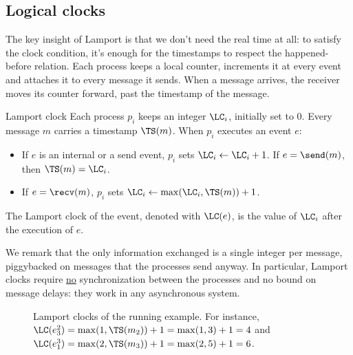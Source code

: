\subsection{Logical clocks}

The key insight of Lamport is that we don't need the real time at all: to satisfy the clock condition, it's enough for the timestamps to respect the happened-before relation. Each process keeps a local counter, increments it at every event and attaches it to every message it sends. When a message arrives, the receiver moves its counter forward, past the timestamp of the message.

\begin{frameddefn}{Lamport clock}
  Each process $p_i$ keeps an integer $\LC_i$, initially set to $0$. Every message $m$ carries a timestamp $\TS(m)$. When $p_i$ executes an event $e$:
  \begin{itemize}
    \item If $e$ is an internal or a send event, $p_i$ sets $\LC_i \leftarrow \LC_i + 1$. If $e = \send(m)$, then $\TS(m) = \LC_i$.
    \item If $e = \recv(m)$, $p_i$ sets $\LC_i \leftarrow \max(\LC_i, \TS(m)) + 1$.
  \end{itemize}
  The Lamport clock of the event, denoted with $\LC(e)$, is the value of $\LC_i$ after the execution of $e$.
\end{frameddefn}

We remark that the only information exchanged is a single integer per message, piggybacked on messages that the processes send anyway. In particular, Lamport clocks require \underline{no} synchronization between the processes and no bound on message delays: they work in any asynchronous system.

\begin{figure}[H]
  \centering
  \caption{Lamport clocks of the running example. For instance, $\LC(e_3^2) = \max(1, \TS(m_2)) + 1 = \max(1,3)+1 = 4$ and $\LC(e_1^3) = \max(2, \TS(m_3)) + 1 = \max(2,5)+1 = 6$.}
  \label{fig:lamport}
\end{figure}


